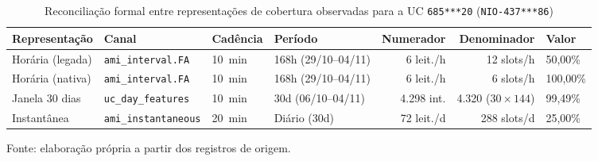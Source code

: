 \begin{table}[htbp]\centering\footnotesize\caption{Reconciliação formal entre representações de cobertura observadas para a UC \texttt{685***20} (\texttt{NIO-437***86})}\label{tab:reconciliacao-uc-685xxx20}
\begin{tabular}{llllrrl}\toprule
Representação & Canal & Cadência & Período & Numerador & Denominador & Valor \\ \midrule
Horária (legada) & \texttt{ami\_interval.FA} & 10~min & 168h (29/10--04/11) & 6 leit./h & 12 slots/h & 50,00\% \\
Horária (nativa) & \texttt{ami\_interval.FA} & 10~min & 168h (29/10--04/11) & 6 leit./h & 6 slots/h & 100,00\% \\
Janela 30 dias & \texttt{uc\_day\_features} & 10~min & 30d (06/10--04/11) & 4.298 int. & 4.320 ($30\times 144$) & 99,49\% \\
Instantânea & \texttt{ami\_instantaneous} & 20~min & Diário (30d) & 72 leit./d & 288 slots/d & 25,00\% \\
\bottomrule\end{tabular}
\par\small Fonte: elaboração própria a partir dos registros de origem.
\end{table}




